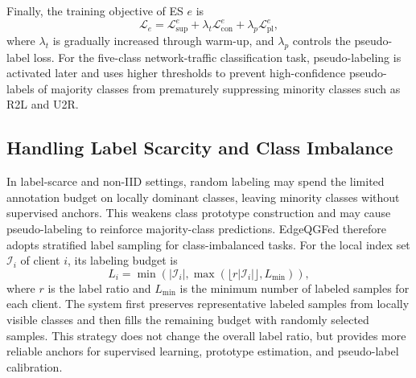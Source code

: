 ﻿\documentclass[10pt, conference, letterpaper]{ IEEEtran}
\begin{document}
Finally, the training objective of ES $e$ is
\begin{equation}
    \mathcal{L}_e =
    \mathcal{L}_{\mathrm{sup}}^e
    + \lambda_t \mathcal{L}_{\mathrm{con}}^e
    + \lambda_p \mathcal{L}_{\mathrm{pl}}^e,
    \label{eq:edge_loss}
\end{equation}
where $\lambda_t$ is gradually increased through warm-up, and $\lambda_p$ controls the pseudo-label loss. For the five-class network-traffic classification task, pseudo-labeling is activated later and uses higher thresholds to prevent high-confidence pseudo-labels of majority classes from prematurely suppressing minority classes such as R2L and U2R.

\subsection{Handling Label Scarcity and Class Imbalance}
\label{subsec:stratified_label}
In label-scarce and non-IID settings, random labeling may spend the limited annotation budget on locally dominant classes, leaving minority classes without supervised anchors. This weakens class prototype construction and may cause pseudo-labeling to reinforce majority-class predictions. EdgeQGFed therefore adopts stratified label sampling for class-imbalanced tasks. For the local index set $\mathcal{I}_i$ of client $i$, its labeling budget is
\begin{equation}
    L_i=\min\left(|\mathcal{I}_i|,\max(\lfloor r|\mathcal{I}_i|\rfloor,L_{\min})\right),
    \label{eq:label_budget}
\end{equation}
where $r$ is the label ratio and $L_{\min}$ is the minimum number of labeled samples for each client. The system first preserves representative labeled samples from locally visible classes and then fills the remaining budget with randomly selected samples. This strategy does not change the overall label ratio, but provides more reliable anchors for supervised learning, prototype estimation, and pseudo-label calibration.

\end{document}
